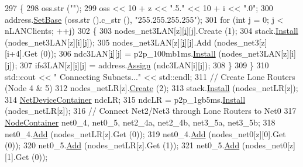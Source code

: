 \begin{DoxyCode}
297         \{
298           oss.str (\textcolor{stringliteral}{""});
299           oss << 10 + z << \textcolor{stringliteral}{".5."} << 10 + i << \textcolor{stringliteral}{".0"};
300           address.\hyperlink{classns3_1_1Ipv4AddressHelper_acf7b16dd25bac67e00f5e25f90a9a035}{SetBase} (oss.str ().c\_str (), \textcolor{stringliteral}{"255.255.255.255"});
301           \textcolor{keywordflow}{for} (\textcolor{keywordtype}{int} j = 0; j < nLANClients; ++j) 
302             \{
303               nodes\_net3LAN[z][\hyperlink{bernuolliDistribution_8m_a6f6ccfcf58b31cb6412107d9d5281426}{i}][j].Create (1);
304               stack.\hyperlink{classns3_1_1InternetStackHelper_a6645b412f31283d2d9bc3d8a95cebbc0}{Install} (nodes\_net3LAN[z][i][j]);
305               nodes\_net3LAN[z][\hyperlink{bernuolliDistribution_8m_a6f6ccfcf58b31cb6412107d9d5281426}{i}][j].Add (nodes\_net3[z][i+4].Get (0));
306               ndc3LAN[\hyperlink{bernuolliDistribution_8m_a6f6ccfcf58b31cb6412107d9d5281426}{i}][j] = p2p\_100mb1ms.\hyperlink{classns3_1_1PointToPointHelper_ab9162fea3e88722666fed1106df1f9ec}{Install} (nodes\_net3LAN[z][i][j]);
307               ifs3LAN[z][\hyperlink{bernuolliDistribution_8m_a6f6ccfcf58b31cb6412107d9d5281426}{i}][j] = address.\hyperlink{classns3_1_1Ipv4AddressHelper_af8e7f4a1a7e74c00014a1eac445a27af}{Assign} (ndc3LAN[i][j]);
308             \}
309         \}
310       std::cout << \textcolor{stringliteral}{"  Connecting Subnets..."} << std::endl;
311       \textcolor{comment}{// Create Lone Routers (Node 4 & 5) }
312       nodes\_netLR[z].\hyperlink{classns3_1_1NodeContainer_a787f059e2813e8b951cc6914d11dfe69}{Create} (2);
313       stack.\hyperlink{classns3_1_1InternetStackHelper_a6645b412f31283d2d9bc3d8a95cebbc0}{Install} (nodes\_netLR[z]);
314       \hyperlink{classns3_1_1NetDeviceContainer}{NetDeviceContainer} ndcLR;
315       ndcLR = p2p\_1gb5ms.\hyperlink{classns3_1_1PointToPointHelper_ab9162fea3e88722666fed1106df1f9ec}{Install} (nodes\_netLR[z]);
316       \textcolor{comment}{// Connect Net2/Net3 through Lone Routers to Net0}
317       \hyperlink{classns3_1_1NodeContainer}{NodeContainer} net0\_4, net0\_5, net2\_4a, net2\_4b, net3\_5a, net3\_5b;
318       net0\_4.\hyperlink{classns3_1_1NodeContainer_aa60b3a0e70f2fb324e16ffcf8bf31fcb}{Add} (nodes\_netLR[z].Get (0));
319       net0\_4.\hyperlink{classns3_1_1NodeContainer_aa60b3a0e70f2fb324e16ffcf8bf31fcb}{Add} (nodes\_net0[z][0].Get (0));
320       net0\_5.\hyperlink{classns3_1_1NodeContainer_aa60b3a0e70f2fb324e16ffcf8bf31fcb}{Add} (nodes\_netLR[z].Get  (1));
321       net0\_5.\hyperlink{classns3_1_1NodeContainer_aa60b3a0e70f2fb324e16ffcf8bf31fcb}{Add} (nodes\_net0[z][1].Get (0));

\end{DoxyCode}
